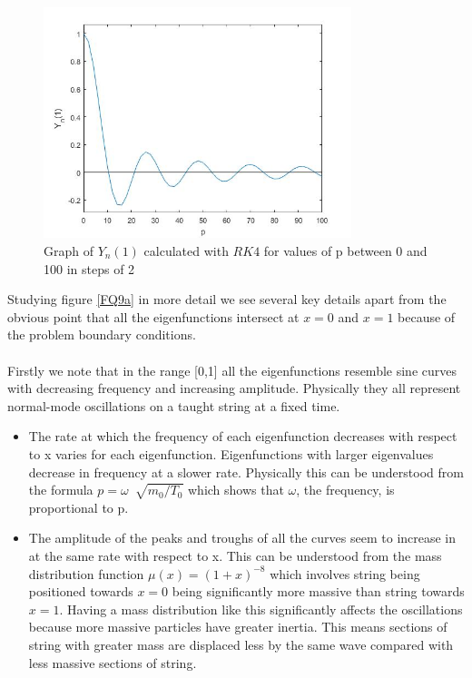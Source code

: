 \documentclass[a4paper]{article}
\begin{document}
\begin{figure}[H]
\centering
\includegraphics[width=0.80\textwidth]{Q9_first5small.jpg}
\caption{Graph of $Y_n(1)$ calculated with $RK4$ for values of p between 0 and 100 in steps of 2}
\label{FQ9b}
\end{figure}

Studying figure \ref{FQ9a} in more detail we see several key details apart from the obvious point that all the eigenfunctions intersect at $x=0$ and $x=1$ because of the problem boundary conditions.
\\ \\
Firstly we note that in the range [0,1] all the eigenfunctions resemble sine curves with decreasing frequency and increasing amplitude. Physically they all represent normal-mode oscillations on a taught string at a fixed time. 
\begin{itemize}
\item The rate at which the frequency of each eigenfunction decreases with respect to x varies for each eigenfunction. Eigenfunctions with larger eigenvalues decrease in frequency at a slower rate. Physically this can be understood from the formula $p=\omega\ \sqrt[]{m_0/T_0}$ which shows that $\omega$, the frequency, is proportional to p.
\item The amplitude of the peaks and troughs of all the curves seem to increase in at the same rate with respect to x. This can be understood from the mass distribution function $\mu(x)=(1+x)^{-8}$ which involves string being positioned towards $x=0$ being significantly more massive than string towards $x=1$. Having a mass distribution like this significantly affects the oscillations because more massive particles have greater inertia. This means sections of string with greater mass are displaced less by the same wave compared with less massive sections of string.
\end{itemize}
\end{document}
